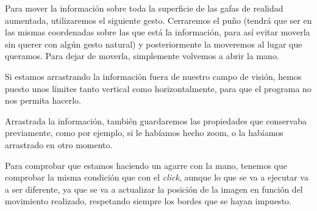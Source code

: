 \documentclass[11pt,a4paper]{article}
\begin{document}
Para mover la información sobre toda la superficie de las gafas de realidad aumentada, utilizaremos el siguiente gesto. Cerraremos el puño
(tendrá que ser en las mismas coordenadas sobre las que está la información, para así evitar moverla sin querer con algún gesto natural) y
posteriormente la moveremos al lugar que queramos. Para dejar de moverla, simplemente volvemos a abrir la mano.

Si estamos arrastrando la información fuera de nuestro campo de visión, hemos puesto unos límites tanto vertical como horizontalmente, para que
el programa no nos permita hacerlo.

Arrastrada la información, también guardaremos las propiedades que conservaba previamente, como por ejemplo, si le habíamos hecho zoom, o la
habíamos arrastrado en otro momento.

Para comprobar que estamos haciendo un agarre con la mano, tenemos que
comprobar la misma condición que con el \textit{click}, aunque lo que se va
a ejecutar va a ser diferente, ya que se va a actualizar la posición de la
imagen en función del movimiento realizado, respetando siempre los bordes
que se hayan impuesto.

\newpage

\begin{thebibliography}{5}
\end{thebibliography}
\end{document}
